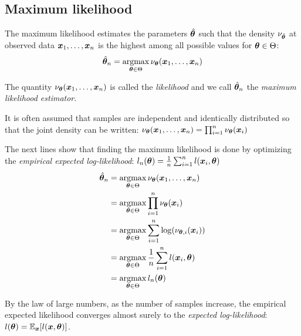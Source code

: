 \subsection{Maximum likelihood}
\label{sec:mlintro}
The maximum likelihood estimates the parameters $\hat{\boldsymbol{\theta}}$ such that the
density $\nu_{\hat{\boldsymbol{\theta}}}$ at observed data $\boldsymbol{x}_1, \dots, \boldsymbol{x}_n$ is the highest among all possible
values for $\boldsymbol{\theta} \in \Theta$:
\begin{align}
  \hat{\boldsymbol{\theta}}_n = \operatorname*{argmax}_{\boldsymbol{\theta} \in \Theta} \nu_{\boldsymbol{\theta}}(\boldsymbol{x}_1, \dots, \boldsymbol{x}_n)
\end{align}

The quantity $\nu_{\boldsymbol{\theta}}(\boldsymbol{x}_1, \dots, \boldsymbol{x}_n)$ is called the
\emph{likelihood} and we call $\hat{\boldsymbol{\theta}}_n$ the \emph{maximum likelihood estimator}.

It is often assumed that samples are independent and identically distributed so that
the joint density can be written:
$\nu_{\boldsymbol{\theta}}(\boldsymbol{x}_1, \dots, \boldsymbol{x}_n) = \prod_{i=1}^n \nu_{\boldsymbol{\theta}}(\boldsymbol{x}_i)$

The next lines show that finding the maximum likelihood is done by optimizing
the \emph{empirical expected log-likelihood}: $l_n(\boldsymbol{\theta}) = \frac1n
\sum_{i=1}^n l(\boldsymbol{x}_i, \boldsymbol{\theta})$ 
\begin{align}
  \hat{\boldsymbol{\theta}}_n &= \operatorname*{argmax}_{\boldsymbol{\theta} \in \Theta} \nu_{\boldsymbol{\theta}}(\boldsymbol{x}_1, \dots, \boldsymbol{x}_n) \\
               &= \operatorname*{argmax}_{\boldsymbol{\theta} \in \Theta} \prod_{i=1}^n \nu_{\boldsymbol{\theta}}(\boldsymbol{x}_i) \\ 
               &= \operatorname*{argmax}_{\boldsymbol{\theta} \in \Theta} \sum_{i=1}^n \log(\nu_{\boldsymbol{\theta}, i}(\boldsymbol{x}_i))  \\
               &= \operatorname*{argmax}_{\boldsymbol{\theta} \in \Theta} \frac1n \sum_{i=1}^n l(\boldsymbol{x}_i, \boldsymbol{\theta}) \\ 
                  &= \operatorname*{argmax}_{\boldsymbol{\theta} \in \Theta} l_n(\boldsymbol{\theta}) \\ 
\end{align}

By the law of large numbers, as the number of samples increase, the empirical
expected likelihood converges almost surely to the \emph{expected
  log-likelihood}: $l(\boldsymbol{\theta}) = \mathbb{E}_{\boldsymbol{x}}[l(\boldsymbol{x}, \boldsymbol{\theta})]$.

